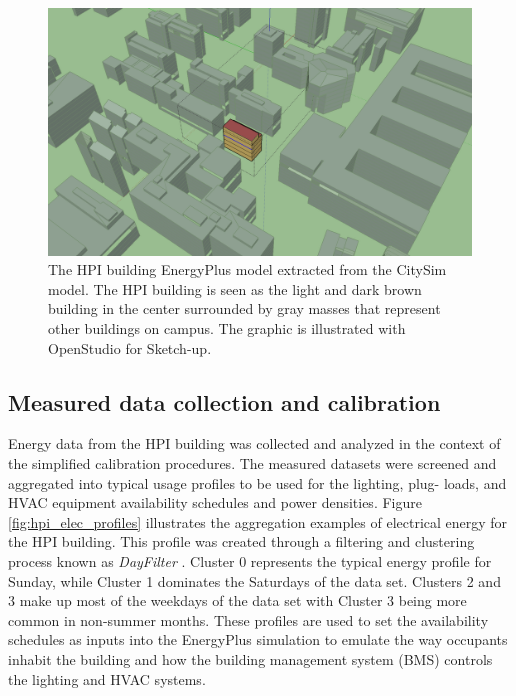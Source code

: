 \documentclass{tBPS2e}
\theoremstyle{plain}
\theoremstyle{definition}
\theoremstyle{remark}
\begin{document}
\begin{figure}[H]
\centering
\includegraphics[scale=0.2]{figures/HPI_Campus.png}
\caption{The HPI building EnergyPlus model extracted from the CitySim model. The HPI building is seen
as the light and dark brown building in the center surrounded by gray masses that represent other buildings on 
campus. The graphic is illustrated with OpenStudio for Sketch-up.}
\label{fig:HPIcampus}
\end{figure}

\subsection{Measured data collection and calibration}
Energy data from the HPI building was collected and analyzed in the context of
the simplified calibration procedures. The measured datasets were screened and
aggregated into typical usage profiles to be used for the lighting, plug-
loads, and HVAC equipment availability schedules and power densities. Figure
\ref{fig:hpi_elec_profiles} illustrates the aggregation examples of electrical
energy for the HPI building. This profile was created through a filtering and
clustering process known as \emph{DayFilter} \citep{Miller:2015kr}. Cluster 0 represents
the typical energy profile for Sunday, while Cluster 1 dominates the Saturdays of the data set.
Clusters 2 and 3 make up most of the weekdays of the data set with Cluster 3 being more common in 
non-summer months. These profiles are used to set the availability schedules as inputs into the
EnergyPlus simulation to emulate the way occupants inhabit the building and
how the building management system (BMS) controls the lighting and HVAC
systems. 
\end{document}
